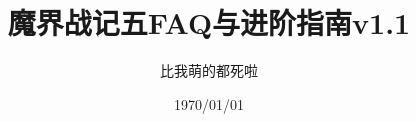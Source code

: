 


\title{魔界战记五FAQ与进阶指南v1.1}
\author{比我萌的都死啦}
\date{1970/01/01}

\maketitle


\newpage
\tableofcontents


% 









	











